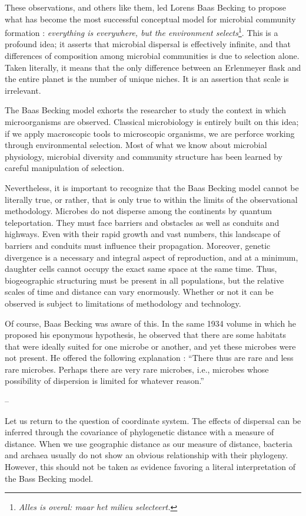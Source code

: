 These observations, and others like them, led Lorens Baas Becking to propose what has become the most successful conceptual model for microbial community formation : {\em everything is everywhere, but the environment selects}\footnote{{\em Alles is overal: maar het milieu selecteert.}}. This is a profound idea; it asserts that microbial dispersal is effectively infinite, and that differences of composition among microbial communities is due to selection alone. Taken literally, it means that the only difference between an Erlenmeyer flask and the entire planet is the number of unique niches. It is an assertion that scale is irrelevant.

The Baas Becking model exhorts the researcher to study the context in which microorganisms are observed. Classical microbiology is entirely built on this idea; if we apply macroscopic tools to microscopic organisms, we are perforce working through environmental selection. Most of what we know about microbial physiology, microbial diversity and community structure has been learned by careful manipulation of selection.

Nevertheless, it is important to recognize that the Baas Becking model cannot be literally true, or rather, that is only true to within the limits of the observational methodology. Microbes do not disperse among the continents by quantum teleportation. They must face barriers and obstacles as well as conduits and highways. Even with their rapid growth and vast numbers, this landscape of barriers and conduits must influence their propagation. Moreover, genetic divergence is a necessary and integral aspect of reproduction, and at a minimum, daughter cells cannot occupy the exact same space at the same time. Thus, biogeographic structuring must be present in all populations, but the relative scales of time and distance can vary enormously. Whether or not it can be observed is subject to limitations of methodology and technology.

Of course, Baas Becking was aware of this. In the same 1934 volume in which he proposed his eponymous hypothesis, he observed that there are some habitats that were ideally suited for one microbe or another, and yet these microbes were not present. He offered the following explanation : ``There thus are rare and less rare microbes. Perhaps there are very rare microbes, i.e., microbes whose possibility of dispersion is limited for whatever reason.''

--

Let us return to the question of coordinate system. The effects of dispersal can be inferred through the covariance of phylogenetic distance with a measure of distance. When we use geographic distance as our measure of distance, bacteria and archaea usually do not show an obvious relationship with their phylogeny. However, this should not be taken as evidence favoring a literal interpretation of the Bass Becking model.

